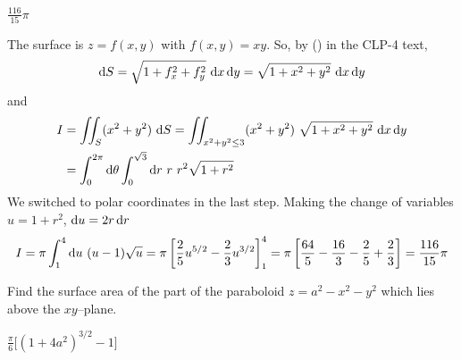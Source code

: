 
\begin{answer} 
$\frac{116}{15}\pi$
\end{answer}

\begin{solution}
The surface is $z=f(x,y)$ with $f(x,y)=xy$. So, by 
() in the CLP-4 text, 
\begin{equation*}
\mathrm{d}S=\sqrt{1+f_x^2+f_y^2}\ \mathrm{d}x\,\mathrm{d}y
         =\sqrt{1+x^2+y^2}\ \mathrm{d}x\,\mathrm{d}y
\end{equation*}
and
\begin{align*}
I &=  \dblInt_S (x^2 + y^2)\ \dee{S}
  = \dblInt_{x^2+y^2\le 3} (x^2 + y^2)\ \sqrt{1+x^2+y^2}\ \dee{x}\,\dee{y} \\
  &= \int_0^{2\pi}\dee{\theta}\int_0^{\sqrt{3}} \dee{r}\ r\ r^2\sqrt{1+r^2}
\end{align*}
We switched to polar coordinates in the last step.   
Making the change of variables $u=1+r^2$, $\mathrm{d}u=2r\,\mathrm{d}r$
\begin{align*}
I = \pi \int_1^{4} \mathrm{d}u\ (u-1)\sqrt{u}
=\pi\left[\frac{2}{5}u^{5/2}-\frac{2}{3}u^{3/2}\right]_1^4
=\pi\left[\frac{64}{5}-\frac{16}{3}-\frac{2}{5}+\frac{2}{3}\right]
=\frac{116}{15}\pi
\end{align*}
\end{solution}


\begin{question}[M253 2013D] %
Find the surface area of the part of the paraboloid 
$z = a^2 - x^2 - y^2$ which lies above the $xy$--plane.
\end{question}


\begin{answer}
$\frac{\pi}{6}\big[{(1+4a^2)}^{3/2}-1\big]$
\end{answer}

